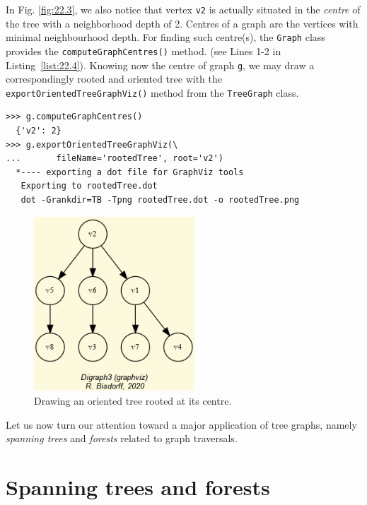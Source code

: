 In Fig. \ref{fig:22.3}, we also notice that vertex \texttt{v2} is actually situated in the \emph{centre} of the tree with a neighborhood depth of 2. Centres of a graph are the vertices with minimal neighbourhood depth. For finding such centre(s), the \texttt{Graph} class provides the \texttt{computeGraphCentres()} method. (see Lines 1-2 in Listing~\ref{list:22.4}). Knowing now the centre of graph \texttt{g}, we may draw a correspondingly rooted and oriented tree with the \texttt{exportOrientedTreeGraphViz()} method from the \texttt{TreeGraph} class.  
\begin{lstlisting}[caption={Computing the centres of a tree and drawing a rooted and oriented tree.},label=list:22.4]
>>> g.computeGraphCentres()
  {'v2': 2}
>>> g.exportOrientedTreeGraphViz(\
...       fileName='rootedTree', root='v2')
  *---- exporting a dot file for GraphViz tools
   Exporting to rootedTree.dot
   dot -Grankdir=TB -Tpng rootedTree.dot -o rootedTree.png
\end{lstlisting}
\begin{figure}[h]
\sidecaption[t]
\includegraphics[width=6cm]{Figures/rootedTree.png}
\caption{Drawing an oriented tree rooted at its centre.} 
\label{fig:22.4}       %
\end{figure}

Let us now turn our attention toward a major application of tree graphs, namely \emph{spanning trees} and \emph{forests} related to graph traversals.

\section{Spanning trees and forests}
\label{sec:22.2}

